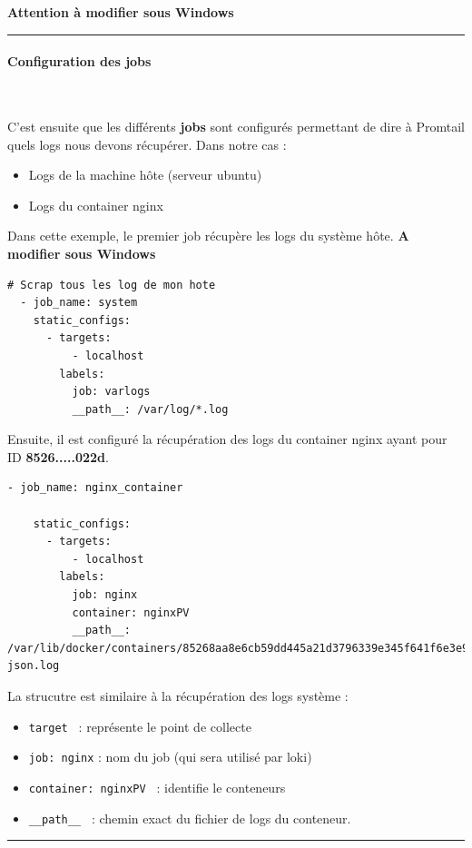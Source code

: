 \documentclass[french, 12pt]{article}%
\newcommand{\itemE}{\item[$\bullet$]}
\begin{document}
\textbf{Attention à modifier sous Windows}



\begin{center}
 \rule{0.5\linewidth}{1pt}
 \end{center}
\paragraph{Configuration des jobs}\ 

C'est ensuite que les différents \textbf{jobs} sont configurés permettant de dire à Promtail quels logs nous devons récupérer. Dans notre cas : 
\begin{itemize}
\itemE Logs de la machine hôte (serveur ubuntu)
\itemE Logs du container nginx
\end{itemize}



Dans cette exemple, le premier job récupère les logs du système hôte. \textbf{A modifier sous Windows}
\begin{lstlisting}[style=commande]
  # Scrap tous les log de mon hote
  - job_name: system
    static_configs:
      - targets:
          - localhost
        labels:
          job: varlogs
          __path__: /var/log/*.log
\end{lstlisting}

Ensuite, il est configuré la récupération des logs du container nginx  ayant pour ID \textbf{8526.....022d}. 
\begin{lstlisting}[style=commande]
- job_name: nginx_container

    static_configs:
      - targets:
          - localhost
        labels:
          job: nginx
          container: nginxPV
          __path__: /var/lib/docker/containers/85268aa8e6cb59dd445a21d3796339e345f641f6e3e91b7606b7d495c342022d/85268aa8e6cb59dd445a21d3796339e345f641f6e3e91b7606b7d495c342022d-json.log
\end{lstlisting}
La strucutre est similaire à la récupération des logs système : 
\begin{itemize}
\itemE \verb?target ? : représente le point de collecte
\itemE \verb?job: nginx? : nom du job (qui sera utilisé par loki)
\itemE \verb?container: nginxPV ? : identifie le conteneurs 
\itemE \verb?__path__ ? : chemin exact du fichier de logs du conteneur.
\end{itemize}


\begin{center}
 \rule{0.5\linewidth}{1pt}
 \end{center}
\end{document}
